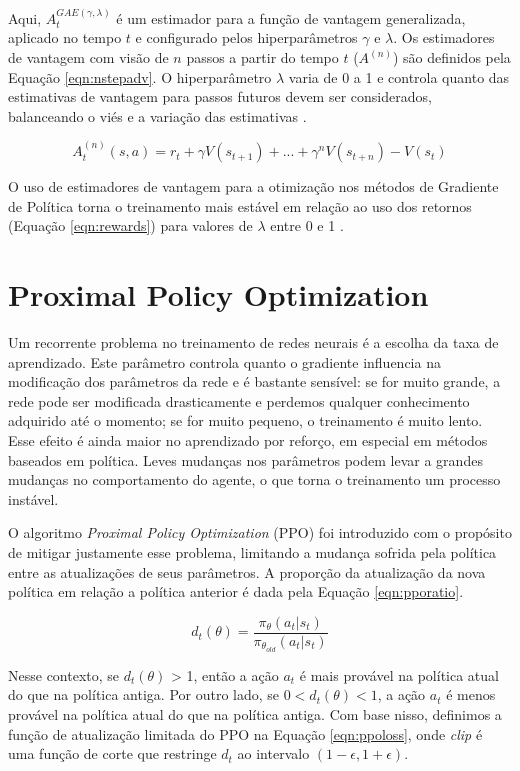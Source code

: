 Aqui, $A_t^{GAE(\gamma, \lambda)}$ é um estimador para a função de vantagem generalizada, aplicado no tempo $t$ e configurado pelos hiperparâmetros $\gamma$ e $\lambda$. Os estimadores de vantagem com visão de $n$ passos a partir do tempo $t$ ($A^{(n)}$) são definidos pela Equação \ref{eqn:nstepadv}. O hiperparâmetro $\lambda$ varia de 0 a 1 e controla quanto das estimativas de vantagem para passos futuros devem ser considerados, balanceando o viés e a variação das estimativas \cite{gae}.

\begin{equation}
\label{eqn:nstepadv}
A_t^{(n)}(s, a) = r_t + \gamma V(s_{t+1}) + ... + \gamma^n V(s_{t+n}) - V(s_t)
\end{equation}

O uso de estimadores de vantagem para a otimização nos métodos de Gradiente de Política torna o treinamento mais estável em relação ao uso dos retornos (Equação \ref{eqn:rewards}) para valores de $\lambda$ entre 0 e 1 \cite{gae}.

\section{Proximal Policy Optimization}
\label{sec:ppo}

Um recorrente problema no treinamento de redes neurais é a escolha da taxa de aprendizado. Este parâmetro controla quanto o gradiente influencia na modificação dos parâmetros da rede e é bastante sensível: se for muito grande, a rede pode ser modificada drasticamente e perdemos qualquer conhecimento adquirido até o momento; se for muito pequeno, o treinamento é muito lento.
Esse efeito é ainda maior no aprendizado por reforço, em especial em métodos baseados em política. Leves mudanças nos parâmetros podem levar a grandes mudanças no comportamento do agente, o que torna o treinamento um processo instável.

O algoritmo \textit{Proximal Policy Optimization} (PPO) \cite{ppo} foi introduzido com o propósito de mitigar justamente esse problema, limitando a mudança sofrida pela política entre as atualizações de seus parâmetros. A proporção da atualização da nova política em relação a política anterior é dada pela Equação \ref{eqn:pporatio}.

\begin{equation}
\label{eqn:pporatio}
d_t(\theta) = \frac{\pi_\theta(a_t|s_t)}{\pi_{\theta_{old}}(a_t|s_t)}
\end{equation}

Nesse contexto, se $d_t(\theta)$ > 1, então a ação $a_t$ é mais provável na política atual do que na política antiga. Por outro lado, se $0 < d_t(\theta) < 1$, a ação $a_t$ é menos provável na política atual do que na política antiga. Com base nisso, definimos a função de atualização limitada do PPO na Equação \ref{eqn:ppoloss}, onde \textit{clip} é uma função de corte que restringe $d_t$ ao intervalo $(1-\epsilon, 1+\epsilon)$.


